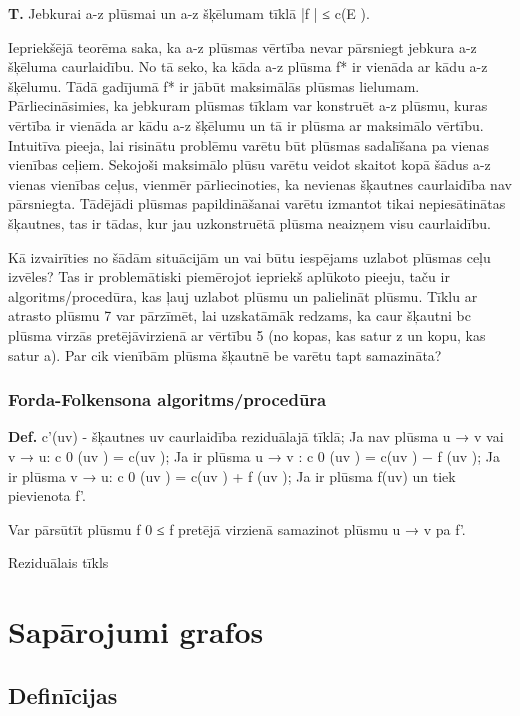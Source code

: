 \documentclass{article}
\begin{document}
\textbf{T. }Jebkurai a-z plūsmai un a-z šķēlumam tīklā |f | ≤ c(E ).

Iepriekšējā teorēma saka, ka a-z plūsmas vērtība nevar pārsniegt jebkura a-z šķēluma caurlaidību. No tā seko, ka kāda a-z plūsma f* ir vienāda ar kādu a-z šķēlumu. Tādā gadījumā f* ir jābūt maksimālās plūsmas lielumam. Pārliecināsimies, ka jebkuram plūsmas tīklam var konstruēt a-z plūsmu, kuras vērtība ir vienāda ar kādu a-z šķēlumu un tā ir plūsma ar maksimālo vērtību.
Intuitīva pieeja, lai risinātu problēmu varētu būt plūsmas sadalīšana pa vienas vienības ceļiem.  Sekojoši maksimālo plūsu varētu veidot skaitot kopā šādus a-z vienas vienības ceļus, vienmēr pārliecinoties, ka nevienas šķautnes caurlaidība nav pārsniegta.  Tādējādi plūsmas papildināšanai varētu izmantot tikai nepiesātinātas šķautnes, tas ir tādas, kur jau uzkonstruētā plūsma neaizņem visu caurlaidību.

Kā izvairīties no šādām situācijām un vai būtu iespējams uzlabot plūsmas ceļu izvēles? Tas ir problemātiski piemērojot iepriekš aplūkoto pieeju, taču ir algoritms/procedūra, kas ļauj uzlabot plūsmu un palielināt plūsmu.  Tīklu ar atrasto plūsmu 7 var pārzīmēt, lai uzskatāmāk redzams, ka caur šķautni bc plūsma virzās pretējāvirzienā ar vērtību 5 (no kopas, kas satur z un kopu, kas satur a).  Par cik vienībām plūsma šķautnē be varētu tapt samazināta?

\subsubsection{Forda-Folkensona algoritms/procedūra}

\textbf{Def.} c'(uv) - šķautnes uv caurlaidība reziduālajā tīklā; Ja nav plūsma u → v vai v → u: c 0 (uv ) = c(uv ); Ja ir plūsma u → v : c 0 (uv ) = c(uv ) − f (uv ); Ja ir plūsma v → u: c 0 (uv ) = c(uv ) + f (uv ); Ja ir plūsma f(uv) un tiek pievienota f'.

Var pārsūtīt plūsmu f 0 ≤ f pretējā virzienā samazinot plūsmu u → v pa f'.

Reziduālais tīkls

\section{Sapārojumi grafos}
\subsection{Definīcijas}
\end{document}
